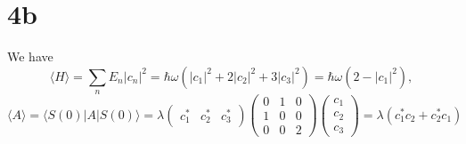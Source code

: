 \documentclass{article}
\begin{document}
\section*{4b}
We have
\[
  \langle H \rangle=\sum_{n}E_{n}|c_{n}|^{2}
  =\hbar\omega\left(|c_{1}|^{2}+ 2|c_{2}|^{2}+3|c_{3}|^{2}\right)
  =\hbar\omega(2-|c_{1}|^{2}),
\]
\[
  \langle A \rangle=\langle S(0)|A|S(0) \rangle
  =\lambda
  \begin{pmatrix}
    c_{1}^{*} & c_{2}^{*} & c_{3}^{*}
  \end{pmatrix}
  \begin{pmatrix}
    0 & 1 & 0 \\
    1 & 0 & 0 \\
    0 & 0 & 2
  \end{pmatrix}
  \begin{pmatrix}
    c_{1} \\
    c_{2} \\
    c_{3}
  \end{pmatrix}
  = \lambda\left(c_{1}^{*}c_{2}+c_{2}^{*}c_{1}\right)
\]
\end{document}

